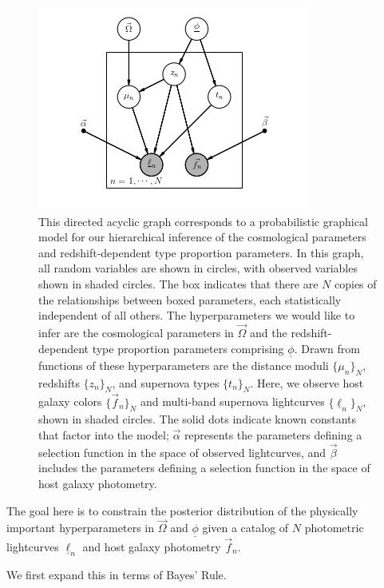 \documentclass[12pt, onecolumn]{emulateapj}
\newcommand{\textul}{\underline}
\begin{document}
\vspace{1in}
\begin{figure}
\begin{center}
\includegraphics{pgm.png}
\caption{This directed acyclic graph corresponds to a probabilistic graphical model for our hierarchical inference of the cosmological parameters and redshift-dependent type proportion parameters.  In this graph, all random variables are shown in circles, with observed variables shown in shaded circles.  The box indicates that there are $N$ copies of the relationships between boxed parameters, each statistically independent of all others.  The hyperparameters we would like to infer are the cosmological parameters in $\vec{\Omega}$ and the redshift-dependent type proportion parameters comprising $\textul{\phi}$.  Drawn from functions of these hyperparameters are the distance moduli $\{\mu_{n}\}_{N}$, redshifts $\{z_{n}\}_{N}$, and supernova types $\{t_{n}\}_{N}$.  Here, we observe host galaxy colors $\{\vec{f}_{n}\}_{N}$ and multi-band supernova lightcurves $\{\textul{\ell}_{n}\}_{N}$, shown in shaded circles.  The solid dots indicate known constants that factor into the model; $\vec{\alpha}$ represents the parameters defining a selection function in the space of observed lightcurves, and $\vec{\beta}$ includes the parameters defining a selection function in the space of host galaxy photometry.}
\label{fig:pgm}
\end{center}
\end{figure}
\vspace{1in}

The goal here is to constrain the posterior distribution of the physically important hyperparameters in $\vec{\Omega}$ and $\textul{\phi}$ given a catalog of $N$ photometric lightcurves $\textul{\ell}_{n}$ and host galaxy photometry $\vec{f}_{n}$.  

We first expand this in terms of Bayes' Rule.
\end{document}
